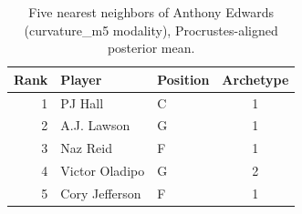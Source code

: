\begin{table}[htbp]
  \centering\small
  \begin{tabular}{rllc}
    \toprule
    Rank & Player & Position & Archetype \\
    \midrule
    1 & PJ Hall & C & 1 \\
    2 & A.J. Lawson & G & 1 \\
    3 & Naz Reid & F & 1 \\
    4 & Victor Oladipo & G & 2 \\
    5 & Cory Jefferson & F & 1 \\
    \bottomrule
  \end{tabular}
  \caption{Five nearest neighbors of Anthony Edwards (curvature_m5 modality), Procrustes-aligned posterior mean.}
  \label{tab:Anthony_Edwards_neighbors_curvature_m5}
\end{table}

